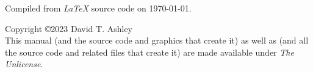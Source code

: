 \thispagestyle{empty}

\vspace*{1cm}
\begin{flushright}
\Huge\bfseries
\ucbkatitle{}
\end{flushright}
\vspace{0.0cm}
\vfill
\begin{flushright}
\begin{small}

\end{small}
\end{flushright}
\vspace{0.2cm}
\begin{flushright}
\begin{small}
Compiled from \emph{\LaTeX{}} source code on \today{}.
\end{small}
\end{flushright}

\pagebreak
\thispagestyle{empty}
\begin{small}
  \noindent Copyright \copyright 2023
  David T. Ashley\\
  This manual (and the source code and graphics that create it) as well
  as \emph{\productname{}} (and all the source code and related files that
  create it) are made available under \emph{The Unlicense}.
\end{small}

\vfill


